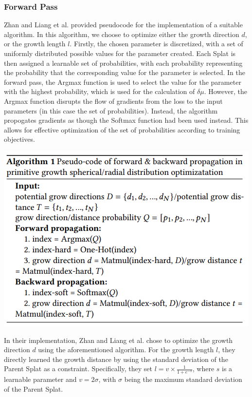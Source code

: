 \documentclass[11pt]{report}
\begin{document}
\subsubsection{Forward Pass}
Zhan and Liang et al. provided pseudocode for the implementation of a suitable algorithm. In this algorithm, we choose to optimize either the growth direction $d$, or the growth length $l$. Firstly, the chosen parameter is discretized, with a set of uniformly distributed possible values for the parameter created. Each Splat is then assigned a learnable set of probabilities, with each probability representing the probability that the corresponding value for the parameter is selected. In the forward pass, the Argmax function is used to select the value for the parameter with the highest probability, which is used for the calculation of $\delta \mu$. However, the Argmax function disrupts the flow of gradients from the loss to the input parameters (in this case the set of probabilities). Instead, the algorithm propogates gradients as though the Softmax function had been used instead. This allows for effective optimization of the set of probabilities according to training objectives.
\begin{center}
\begin{minipage}{0.6\linewidth}
\includegraphics[width = \linewidth]{assets/clone_algo}
\end{minipage}
\end{center}
In their implementation, Zhan and Liang et al. chose to optimize the growth direction $d$ using the aforementioned algorithm. For the growth length $l$, they directly learned the growth distance by using the standard deviation of the Parent Splat as a constraint. Specifically, they set $l = v \times \frac{1}{1 + e^{-s}}$, where $s$ is a learnable parameter and $v = 2 \sigma$, with $\sigma$ being the maximum standard deviation of the Parent Splat.
\end{document}
